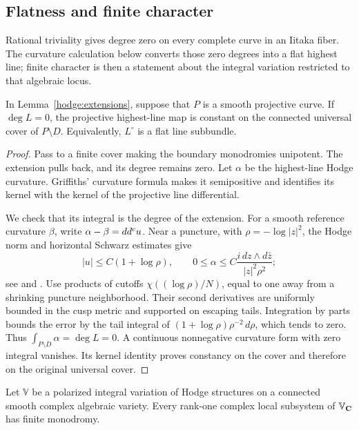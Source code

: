 \subsection{Flatness and finite character}

Rational triviality gives degree zero on every complete curve in an
Iitaka fiber. The curvature calculation below converts those zero
degrees into a flat highest line; finite character is then a statement
about the integral variation restricted to that algebraic locus.

\begin{corollary}\label{hodge:degree-zero}
In Lemma~\ref{hodge:extensions}, suppose that $P$ is a smooth
projective curve. If $\deg L=0$, the projective highest-line map is
constant on the connected universal cover of $P\setminus D$.
Equivalently, $L^\circ$ is a flat line subbundle.
\end{corollary}

\begin{proof}
Pass to a finite cover making the boundary monodromies unipotent.
The extension pulls back, and its degree remains zero. Let $\alpha$
be the highest-line Hodge curvature. Griffiths' curvature formula
makes it semipositive and identifies its kernel with the kernel of
the projective line differential.

We check that its integral is the degree of the extension. For a smooth
reference curvature $\beta$, write $\alpha-\beta=dd^c u$. Near a
puncture, with $\rho=-\log|z|^2$, the Hodge norm and horizontal Schwarz
estimates give
\[
 |u|\le C(1+\log\rho),\qquad
 0\le\alpha\le C\frac{i\,dz\wedge d\bar z}{|z|^2\rho^2};
\]
see \cite[Theorem~5.1]{CK1989} and
\cite[Proposition~2.4 and Lemma~2.5]{BrunebarbeCadorel}.
Use products of cutoffs $\chi((\log\rho)/N)$, equal to one away
from a shrinking puncture neighborhood. Their second derivatives
are uniformly bounded in the cusp metric and supported on escaping
tails. Integration by parts bounds the error by the tail integral of
$(1+\log\rho)\rho^{-2}\,d\rho$, which tends to zero.
Thus $\int_{P\setminus D}\alpha=\deg L=0$. A continuous
nonnegative curvature form with zero integral vanishes. Its kernel
identity proves constancy on the cover and therefore on the original
universal cover.
\end{proof}

\begin{corollary}\label{lem:finite-character}
Let $\mathbb V$ be a polarized integral variation of Hodge structures
on a connected smooth complex algebraic variety. Every rank-one
complex local subsystem of $\mathbb V_{\mathbf C}$ has finite monodromy.
\end{corollary}

